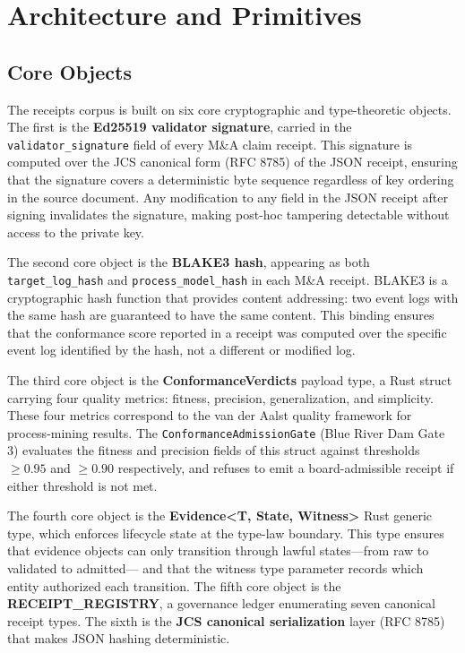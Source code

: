 \section{Architecture and Primitives}
\label{sec:receipts-architecture}

\subsection{Core Objects}
\label{sec:receipts-architecture-objects}

The receipts corpus is built on six core cryptographic and type-theoretic objects. The
first is the \textbf{Ed25519 validator signature}, carried in the \texttt{validator\_signature}
field of every M\&A claim receipt. This signature is computed over the JCS canonical form
(RFC 8785) of the JSON receipt, ensuring that the signature covers a deterministic byte
sequence regardless of key ordering in the source document. Any modification to any field
in the JSON receipt after signing invalidates the signature, making post-hoc tampering
detectable without access to the private key.

The second core object is the \textbf{BLAKE3 hash}, appearing as both \texttt{target\_log\_hash}
and \texttt{process\_model\_hash} in each M\&A receipt. BLAKE3 is a cryptographic hash
function that provides content addressing: two event logs with the same hash are guaranteed
to have the same content. This binding ensures that the conformance score reported in a receipt
was computed over the specific event log identified by the hash, not a different or modified log.

The third core object is the \textbf{ConformanceVerdicts} payload type, a Rust struct carrying
four quality metrics: fitness, precision, generalization, and simplicity. These four metrics
correspond to the van der Aalst quality framework for process-mining results. The
\texttt{ConformanceAdmissionGate} (Blue River Dam Gate 3) evaluates the fitness and precision
fields of this struct against thresholds $\geq 0.95$ and $\geq 0.90$ respectively, and refuses
to emit a board-admissible receipt if either threshold is not met.

The fourth core object is the \textbf{Evidence\textless{}T, State, Witness\textgreater{}} Rust
generic type, which enforces lifecycle state at the type-law boundary. This type ensures that
evidence objects can only transition through lawful states---from raw to validated to admitted---
and that the witness type parameter records which entity authorized each transition. The
fifth core object is the \textbf{RECEIPT\_REGISTRY}, a governance ledger enumerating seven
canonical receipt types. The sixth is the \textbf{JCS canonical serialization} layer (RFC 8785)
that makes JSON hashing deterministic.

